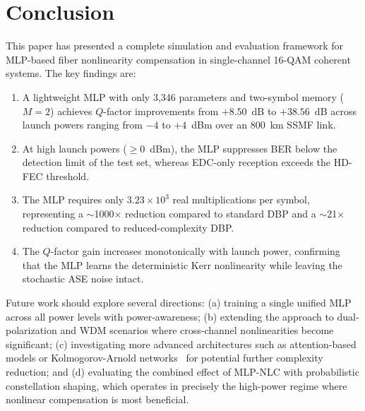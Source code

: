 \documentclass[conference]{IEEEtran}
\begin{document}
\section{Conclusion}
\label{sec:conclusion}

This paper has presented a complete simulation and evaluation framework for MLP-based fiber nonlinearity compensation in single-channel 16-QAM coherent systems. The key findings are:

\begin{enumerate}
    \item A lightweight MLP with only 3,346 parameters and two-symbol memory ($M = 2$) achieves $Q$-factor improvements from $+8.50$~dB to $+38.56$~dB across launch powers ranging from $-4$ to $+4$~dBm over an 800~km SSMF link.
    \item At high launch powers ($\ge 0$~dBm), the MLP suppresses BER below the detection limit of the test set, whereas EDC-only reception exceeds the HD-FEC threshold.
    \item The MLP requires only $3.23 \times 10^3$ real multiplications per symbol, representing a $\sim$1000$\times$ reduction compared to standard DBP and a $\sim$21$\times$ reduction compared to reduced-complexity DBP.
    \item The $Q$-factor gain increases monotonically with launch power, confirming that the MLP learns the deterministic Kerr nonlinearity while leaving the stochastic ASE noise intact.
\end{enumerate}

Future work should explore several directions: (a) training a single unified MLP across all power levels with power-awareness; (b) extending the approach to dual-polarization and WDM scenarios where cross-channel nonlinearities become significant; (c) investigating more advanced architectures such as attention-based models or Kolmogorov-Arnold networks~\cite{gdpkan2025} for potential further complexity reduction; and (d) evaluating the combined effect of MLP-NLC with probabilistic constellation shaping, which operates in precisely the high-power regime where nonlinear compensation is most beneficial.
\end{document}

